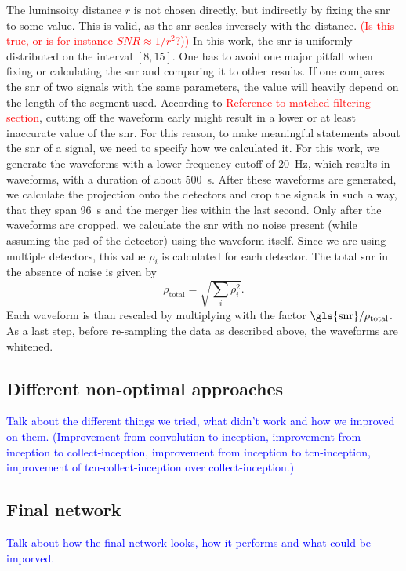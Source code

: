 The luminsoity distance $r$ is not chosen directly, but indirectly by fixing the \gls{snr} to some value. This is valid, as the \gls{snr} scales inversely with the distance. \textcolor{red}{(Is this true, or is for instance $SNR\approx 1/r^2$?))} In this work, the \gls{snr} is uniformly distributed on the interval $\left[8,15\right]$. One has to avoid one major pitfall when fixing or calculating the \gls{snr} and comparing it to other results. If one compares the \gls{snr} of two signals with the same parameters, the value will heavily depend on the length of the segment used. According to \textcolor{red}{Reference to matched filtering section}, cutting off the waveform early might result in a lower or at least inaccurate value of the \gls{snr}. For this reason, to make meaningful statements about the \gls{snr} of a signal, we need to specify how we calculated it. For this work, we generate the waveforms with a lower frequency cutoff of \SI{20}{\hertz}, which results in waveforms, with a duration of about \SI{500}{\s}. After these waveforms are generated, we calculate the projection onto the detectors and crop the signals in such a way, that they span \SI{96}{\s} and the merger lies within the last second. Only after the waveforms are cropped, we calculate the \gls{snr} with no noise present (while assuming the \gls{psd} of the detector) using the waveform itself. Since we are using multiple detectors, this value $\rho_i$ is calculated for each detector. The total \gls{snr} in the absence of noise is given by
\begin{equation}
\rho_\text{total} = \sqrt{\sum_i\rho_i^2}.
\end{equation}
Each waveform is than rescaled by multiplying with the factor $\text{\gls{snr}} / \rho_\text{total}$. As a last step, before re-sampling the data as described above, the waveforms are whitened. 

\subsection{Different non-optimal approaches}
\textcolor{blue}{Talk about the different things we tried, what didn't work and how we improved on them. (Improvement from convolution to inception, improvement from inception to collect-inception, improvement from inception to tcn-inception, improvement of tcn-collect-inception over collect-inception.)}
\subsection{Final network}
\textcolor{blue}{Talk about how the final network looks, how it performs and what could be imporved.}
